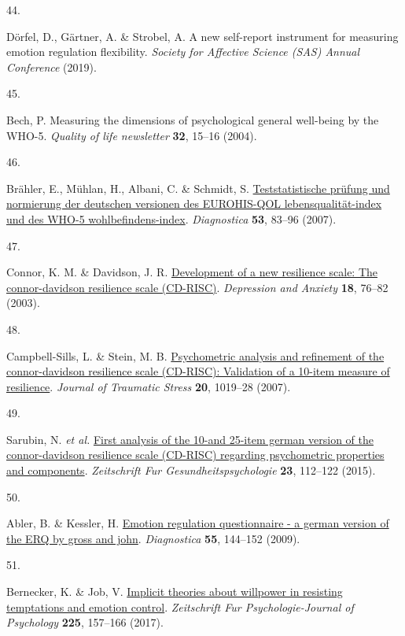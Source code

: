 \documentclass[
  man,floatsintext]{apa6}
\newlength{\cslhangindent}
\newlength{\csllabelwidth}
\newlength{\cslentryspacingunit} %
\newenvironment{CSLReferences}[2] %
 {%
  \setlength{\parindent}{0pt}
  \ifodd #1
  \let\oldpar\par
  \def\par{\hangindent=\cslhangindent\oldpar}
  \fi
  \setlength{\parskip}{#2\cslentryspacingunit}
 }%
 {}
\newcommand{\CSLLeftMargin}[1]{\parbox[t]{\csllabelwidth}{#1}}
\newcommand{\CSLRightInline}[1]{\parbox[t]{\linewidth - \csllabelwidth}{#1}\break}
\begin{document}
\begin{CSLReferences}{0}{0}
\leavevmode{}%
\CSLLeftMargin{44. }%
\CSLRightInline{Dörfel, D., Gärtner, A. \& Strobel, A. A new self-report instrument for measuring emotion regulation flexibility. \emph{Society for Affective Science (SAS) Annual Conference} (2019).}

\leavevmode{}%
\CSLLeftMargin{45. }%
\CSLRightInline{Bech, P. Measuring the dimensions of psychological general well-being by the WHO-5. \emph{Quality of life newsletter} \textbf{32}, 15--16 (2004).}

\leavevmode{}%
\CSLLeftMargin{46. }%
\CSLRightInline{Brähler, E., Mühlan, H., Albani, C. \& Schmidt, S. \href{https://doi.org/10.1026/0012-1924.53.2.83}{Teststatistische pr{ü}fung und normierung der deutschen versionen des EUROHIS-QOL lebensqualit{ä}t-index und des WHO-5 wohlbefindens-index}. \emph{Diagnostica} \textbf{53}, 83--96 (2007).}

\leavevmode{}%
\CSLLeftMargin{47. }%
\CSLRightInline{Connor, K. M. \& Davidson, J. R. \href{https://doi.org/10.1002/da.10113}{Development of a new resilience scale: The connor-davidson resilience scale (CD-RISC)}. \emph{Depression and Anxiety} \textbf{18}, 76--82 (2003).}

\leavevmode{}%
\CSLLeftMargin{48. }%
\CSLRightInline{Campbell-Sills, L. \& Stein, M. B. \href{https://doi.org/10.1002/jts.20271}{Psychometric analysis and refinement of the connor-davidson resilience scale (CD-RISC): Validation of a 10-item measure of resilience}. \emph{Journal of Traumatic Stress} \textbf{20}, 1019--28 (2007).}

\leavevmode{}%
\CSLLeftMargin{49. }%
\CSLRightInline{Sarubin, N. \emph{et al.} \href{https://doi.org/10.1026/0943-8149/a000142}{First analysis of the 10-and 25-item german version of the connor-davidson resilience scale (CD-RISC) regarding psychometric properties and components}. \emph{Zeitschrift Fur Gesundheitspsychologie} \textbf{23}, 112--122 (2015).}

\leavevmode{}%
\CSLLeftMargin{50. }%
\CSLRightInline{Abler, B. \& Kessler, H. \href{https://doi.org/10.1026/0012-1924.55.3.144}{Emotion regulation questionnaire - a german version of the ERQ by gross and john}. \emph{Diagnostica} \textbf{55}, 144--152 (2009).}

\leavevmode{}%
\CSLLeftMargin{51. }%
\CSLRightInline{Bernecker, K. \& Job, V. \href{https://doi.org/10.1027/2151-2604/a000292}{Implicit theories about willpower in resisting temptations and emotion control}. \emph{Zeitschrift Fur Psychologie-Journal of Psychology} \textbf{225}, 157--166 (2017).}


\end{CSLReferences}
\end{document}
